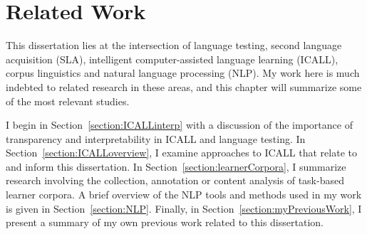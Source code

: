 \chapter{Related Work}
\label{chap:lit}

This dissertation lies at the intersection of language testing, second language acquisition (SLA), intelligent computer-assisted language learning (ICALL), corpus linguistics and natural language processing (NLP). My work here is much indebted to related research in these areas, and this chapter will summarize some of the most relevant studies.


I begin in Section~\ref{section:ICALLinterp} with a discussion of the importance of transparency and interpretability in ICALL and language testing. In  Section~\ref{section:ICALLoverview}, I examine approaches to ICALL that relate to and inform this dissertation. In Section~\ref{section:learnerCorpora}, I summarize research involving the collection, annotation or content analysis of task-based learner corpora. A brief overview of the NLP tools and methods used in my work is given in Section~\ref{section:NLP}. Finally, in Section~\ref{section:myPreviousWork}, I present a summary of my own previous work related to this dissertation. 

